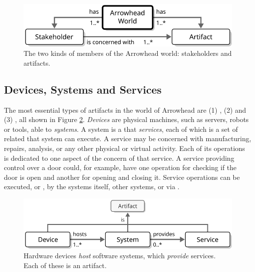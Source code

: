 \vfill

\begin{figure}[ht!]
  \centering
  \includegraphics[scale=0.9]{figures/world}
  \caption{
    The two kinds of members of the Arrowhead world: stakeholders and artifacts.
  }
  \label{fig:world}
\end{figure}

\vspace*{-3mm}

\subsection{Devices, Systems and Services}

The most essential types of artifacts in the world of Arrowhead are (1) , (2)  and (3) , all shown in Figure \ref{fig:device-system-service}.
\textit{Devices} are physical machines, such as servers, robots or tools, able to  \textit{systems}.
A system is a   that  \textit{services}, each of which is a set of related  that system can execute.
A service may be concerned with manufacturing, repairs, analysis, or any other physical or virtual activity.
Each of its operations is dedicated to one aspect of the concern of that service.
A service providing control over a door could, for example, have one operation for checking if the door is open and another for opening and closing it.
Service operations can be executed, or , by the systems itself, other systems, or  via .

\vfill

\begin{figure}[ht!]
  \centering
  \includegraphics[scale=0.9]{figures/device-system-service}
  \caption{
    Hardware devices \textit{host} software systems, which \textit{provide} services.
    Each of these is an artifact.
  }
  \label{fig:device-system-service}
\end{figure}

